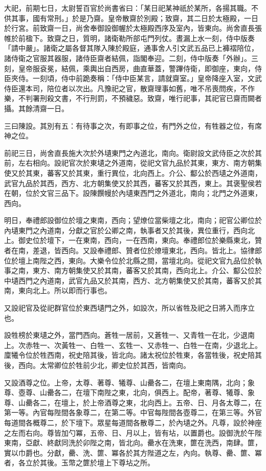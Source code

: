 \begin{pinyinscope}
 大祀，前期七日，太尉誓百官於尚書省曰：「某日祀某神祇於某所，各揚其職。不供其事，國有常刑。」於是乃齋。皇帝散齋於別殿；致齋，其二日於太極殿，一日於行宮。前致齋一日，尚舍奉御設御幄於太極殿西序及室內，皆東向。尚舍直長張帷於前楹下。致齋之日，質明，諸衛勒所部屯門列仗。晝漏上水一刻，侍中版奏「請中嚴」。諸衛之屬各督其隊入陳於殿庭，通事舍人引文武五品已上褲褶陪位，諸侍衛之官服其器服，諸侍臣齋者結佩，詣閣奉迎。二刻，侍中版奏「外辦」。三刻，皇帝服袞冕，結佩，乘輿出自西房，曲直華蓋，警蹕侍衛，即御座，東向，侍臣夾侍。一刻頃，侍中前跪奏稱：「侍中臣某言，請就齋室。」皇帝降座入室，文武侍臣還本司，陪位者以次出。凡豫祀之官，散齋理事如舊，唯不吊喪問疾，不作樂，不判署刑殺文書，不行刑罰，不預穢惡。致齋，唯行祀事，其祀官已齋而闕者攝。其餘清齋一日。



 三曰陳設。其別有五：有待事之次，有即事之位，有門外之位，有牲器之位，有席神之位。



 前祀三日，尚舍直長施大次於外壝東門之內道北，南向。衛尉設文武侍臣之次於其前，左右相向。設祀官次於東壝之外道南，從祀文官九品於其東，東方、南方朝集使又於其東，蕃客又於其東，重行異位，北向西上。介公、酅公於西壝之外道南，武官九品於其西，西方、北方朝集使又於其西，蕃客又於其西，東上。其褒聖侯若在朝，位於文官三品下。設陳饌幔於內壝東西門之外道北，南向；北門之外道東，西向。



 明日，奉禮郎設御位於壇之東南，西向；望燎位當柴壇之北，南向；祀官公卿位於內壝東門之內道南，分獻之官於公卿之南，執事者又於其後，異位重行，西向北上。御史位於壇下，一在東南，西向，一在西南，東向。奉禮郎位於樂縣東北，贊者在南，差退，皆西向。又設奉禮郎、贊者位於燎壇東北，西向。皆北上。協律郎位於壇上南陛之西，東向。大樂令位於北縣之間，當壇北向。從祀文官九品位於執事之南，東方、南方朝集使又於其南，蕃客又於其南，西向北上。介公、酅公位於中壝西門之內道南，武官九品又於其南，西方、北方朝集使又於其南，蕃客又於其南，東向北上。所以即而行事也。



 又設祀官及從祀群官位於東西壝門之外，如設次，所以省牲及祀之日將入而序立也。



 設牲榜於東壝之外，當門西向。蒼牲一居前，又蒼牲一、又青牲一在北，少退南上。次赤牲一、次黃牲一、白牲一、玄牲一、又赤牲一、白牲一在南，少退北上。廩犧令位於牲西南，祝史陪其後，皆北向。諸太祝位於牲東，各當牲後，祝史陪其後，西向。太常卿位於牲前少北，卿史位於其西，皆南向。



 又設酒尊之位。上帝，太尊、著尊、犧尊、山罍各二，在壇上東南隅，北向；象尊、壺尊、山罍各二，在壇下南陛之東，北向，俱西上。配帝，著尊、犧尊、象尊、山罍各二，在壇上，於上帝酒尊之東，北向西上。五帝、日、月各太尊二，在第一等。內官每陛間各象尊二，在第二等。中官每陛間各壺尊二，在第三等。外官每道間各概尊二，於下壇下。眾星每道間各散尊二，於內壝之外。凡尊，設於神座之左而右向。尊皆加勺冪，五帝、日、月以上，皆有坫，以置爵也。設御洗於午陛東南，亞獻、終獻同洗於卯陛之南，皆北向。罍水在洗東，篚在洗西，南肆。篚，實以巾爵也。分獻，罍、洗、篚、冪各於其方陛道之左，內向。執尊、罍、篚、冪者，各立於其後。玉幣之篚於壇上下尊坫之所。




\end{pinyinscope}

